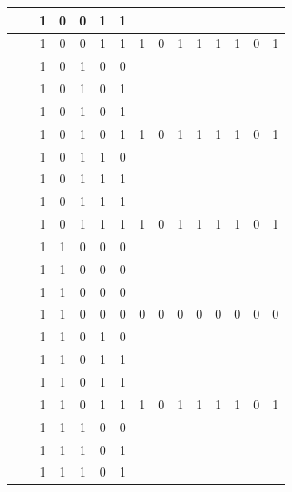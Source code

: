 \begin{table}[!tb]
\begin{tabular}{|c|c|c|c|c|c|c|c|c|c|c|c|c|c|c|}
        \rowcolor{yellow!40}  &  & 1 & 0 & 0 & 1 & 1 &  &  &  &  &  &  &  &  \\ \hline
        \rowcolor{yellow!40}  &  & 1 & 0 & 0 & 1 & 1 & 1 & 0 & 1 & 1 & 1 & 1 & 0 & 1 \\ \hline
        \rowcolor{gray!40}  &  & 1 & 0 & 1 & 0 & 0 &  &  &  &  &  &  &  &  \\ \hline
        \rowcolor{gray!40}  &  & 1 & 0 & 1 & 0 & 1 &  &  &  &  &  &  &  &  \\ \hline
        \rowcolor{gray!40}  &  & 1 & 0 & 1 & 0 & 1 &  &  &  &  &  &  &  &  \\ \hline
        \rowcolor{gray!40}  &  & 1 & 0 & 1 & 0 & 1 & 1 & 0 & 1 & 1 & 1 & 1 & 0 & 1 \\ \hline
        \rowcolor{blue!40}  &  & 1 & 0 & 1 & 1 & 0 &  &  &  &  &  &  &  &  \\ \hline
        \rowcolor{blue!40}  &  & 1 & 0 & 1 & 1 & 1 &  &  &  &  &  &  &  &  \\ \hline
        \rowcolor{blue!40}  &  & 1 & 0 & 1 & 1 & 1 &  &  &  &  &  &  &  &  \\ \hline
        \rowcolor{blue!40}  &  & 1 & 0 & 1 & 1 & 1 & 1 & 0 & 1 & 1 & 1 & 1 & 0 & 1 \\ \hline
        \rowcolor{red!40}  &  & 1 & 1 & 0 & 0 & 0 &  &  &  &  &  &  &  &  \\ \hline
        \rowcolor{red!40}  &  & 1 & 1 & 0 & 0 & 0 &  &  &  &  &  &  &  &  \\ \hline
        \rowcolor{red!40}  &  & 1 & 1 & 0 & 0 & 0 &  &  &  &  &  &  &  &  \\ \hline
        \rowcolor{red!40}  &  & 1 & 1 & 0 & 0 & 0 & 0 & 0 & 0 & 0 & 0 & 0 & 0 & 0 \\ \hline
        \rowcolor{green!40}  &  & 1 & 1 & 0 & 1 & 0 &  &  &  &  &  &  &  &  \\ \hline
        \rowcolor{green!40}  &  & 1 & 1 & 0 & 1 & 1 &  &  &  &  &  &  &  &  \\ \hline
        \rowcolor{green!40}  &  & 1 & 1 & 0 & 1 & 1 &  &  &  &  &  &  &  &  \\ \hline
        \rowcolor{green!40}  &  & 1 & 1 & 0 & 1 & 1 & 1 & 0 & 1 & 1 & 1 & 1 & 0 & 1 \\ \hline
        \rowcolor{yellow!40}  &  & 1 & 1 & 1 & 0 & 0 &  &  &  &  &  &  &  &  \\ \hline
        \rowcolor{yellow!40}  &  & 1 & 1 & 1 & 0 & 1 &  &  &  &  &  &  &  &  \\ \hline
        \rowcolor{yellow!40}  &  & 1 & 1 & 1 & 0 & 1 &  &  &  &  &  &  &  &  \\ \hline

\end{tabular}
\end{table}
